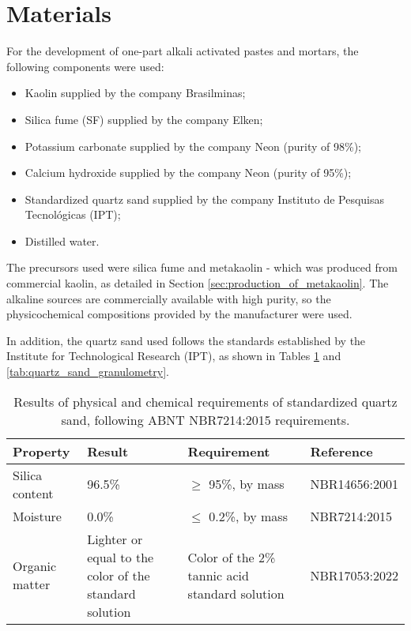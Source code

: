 \section{Materials}
\label{sec:materials}

For the development of one-part alkali activated pastes and mortars, the following components were used:

\begin{itemize}
    \item Kaolin supplied by the company Brasilminas;
    \item Silica fume (SF) supplied by the company Elken;
    \item Potassium carbonate supplied by the company Neon (purity of 98\%);
    \item Calcium hydroxide supplied by the company Neon  (purity of 95\%);
    \item Standardized quartz sand supplied by the company Instituto de Pesquisas Tecnológicas (IPT);
    \item Distilled water.
\end{itemize}

The precursors used were silica fume and metakaolin - which  was produced from commercial kaolin, as detailed in Section \ref{sec:production_of_metakaolin}.
The alkaline sources are commercially available with high purity, so the physicochemical compositions provided by the manufacturer were used.

In addition, the quartz sand used follows the standards established by the Institute for Technological Research (IPT), as shown in Tables \ref{tab:quartz_sand_properties} and \ref{tab:quartz_sand_granulometry}.

\begin{table}[H]
    \caption{Results of physical and chemical requirements of standardized quartz sand, following ABNT NBR7214:2015 requirements.}
    \label{tab:quartz_sand_properties}
    \centering
    \begin{tabular}{p{} p{} p{} p{}}
        \hline
        Property & Result & Requirement & Reference\\
        \hline
        Silica content  & 96.5\% & $\geq$ 95\%, by mass & NBR14656:2001\\
        Moisture  & 0.0\% & $\leq$ 0.2\%, by mass & NBR7214:2015\\
        Organic matter  & Lighter or equal to the color of the standard solution & Color of the 2\% tannic acid standard solution & NBR17053:2022\\
        \hline
    \end{tabular}
\end{table}

